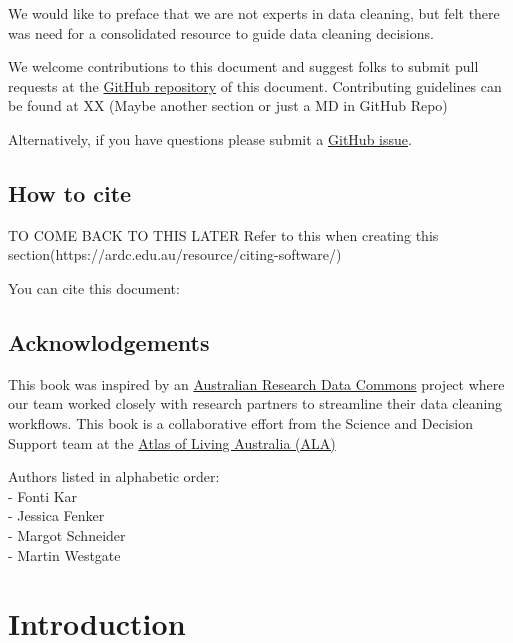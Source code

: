 \documentclass[
  letterpaper,
  DIV=11,
  numbers=noendperiod,
  oneside]{scrreprt}
\begin{document}
We would like to preface that we are not experts in data cleaning, but
felt there was need for a consolidated resource to guide data cleaning
decisions.

We welcome contributions to this document and suggest folks to submit
pull requests at the
\href{https://github.com/AtlasOfLivingAustralia/cleaning_data}{GitHub
repository} of this document. Contributing guidelines can be found at XX
(Maybe another section or just a MD in GitHub Repo)

Alternatively, if you have questions please submit a
\href{https://github.com/AtlasOfLivingAustralia/cleaning_data/issues}{GitHub
issue}.

\hypertarget{how-to-cite}{%
\section*{How to cite}\label{how-to-cite}}


TO COME BACK TO THIS LATER Refer to this when creating this
section(https://ardc.edu.au/resource/citing-software/)

You can cite this document:

\hypertarget{acknowlodgements}{%
\section*{Acknowlodgements}\label{acknowlodgements}}


This book was inspired by an \href{https://ardc.edu.au/}{Australian
Research Data Commons} project where our team worked closely with
research partners to streamline their data cleaning workflows. This book
is a collaborative effort from the Science and Decision Support team at
the \href{https://www.ala.org.au/}{Atlas of Living Australia (ALA)}

Authors listed in alphabetic order:\\
- Fonti Kar\\
- Jessica Fenker\\
- Margot Schneider\\
- Martin Westgate


\hypertarget{introduction}{%
\chapter{Introduction}\label{introduction}}
\end{document}

